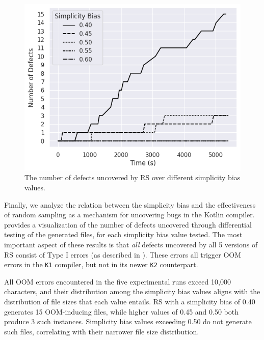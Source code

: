 \begin{figure}
    \centering
    \includegraphics[scale=0.6]{img/rq1-1/convergence-rq-1-1.png}
    \caption{The number of defects uncovered by \gls{RS} over different simplicity bias values.}
    \label{fig:rq1-1convergence}
\end{figure}


Finally, we analyze the relation between the simplicity bias
and the effectiveness of random sampling as a
mechanism for uncovering bugs in the Kotlin compiler.
 provides a visualization of the number of
defects uncovered through differential testing of the generated files,
for each simplicity bias value tested.
The most important aspect of these results is that \textit{all} defects
uncovered by all 5 versions of \gls{RS} consist of
Type I errors (as described in ).
These errors all trigger \gls{OOM} errors in the \texttt{K1}
compiler, but not in its newer \texttt{K2} counterpart.

All \gls{OOM} errors encountered in the five experimental runs
exceed 10,000 characters, and their distribution among the
simplicity bias values aligns with the distribution
of file sizes that each value entails.
\gls{RS} with a simplicity bias of 0.40 generates 15 \gls{OOM}-inducing
files, while higher values of 0.45 and 0.50 both produce 3 such instances.
Simplicity bias values exceeding 0.50 do not generate such files,
correlating with their narrower file size distribution.

\begin{center}
\end{center}


